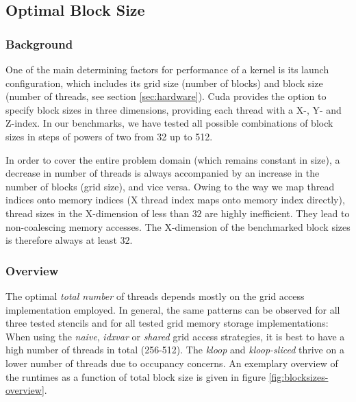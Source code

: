 
\subsection{Optimal Block Size}

\subsubsection{Background}

One of the main determining factors for performance of a kernel is its launch configuration, which includes its grid size (number of blocks) and block size (number of threads, see section \ref{sec:hardware}). Cuda provides the option to specify block sizes in three dimensions, providing each thread with a X-, Y- and Z-index. In our benchmarks, we have tested all possible combinations of block sizes in steps of powers of two from 32 up to 512.

In order to cover the entire problem domain (which remains constant in size), a decrease in number of threads is always accompanied by an increase in the number of blocks (grid size), and vice versa. Owing to the way we map thread indices onto memory indices (X thread index maps onto memory index directly), thread sizes in the X-dimension of less than $32$ are highly inefficient. They lead to non-coalescing memory accesses. The X-dimension of the benchmarked block sizes is therefore always at least $32$.

\subsubsection{Overview}

The optimal \emph{total number} of threads depends mostly on the grid access implementation employed. In general, the same patterns can be observed for all three tested stencils and for all tested grid memory storage implementations: When using the \emph{naive}, \emph{idxvar} or \emph{shared} grid access strategies, it is best to have a high number of threads in total (256-512). The \emph{kloop} and \emph{kloop-sliced} thrive on a lower number of threads due to occupancy concerns. An exemplary overview of the runtimes as a function of total block size is given in figure \ref{fig:blocksizes-overview}.


